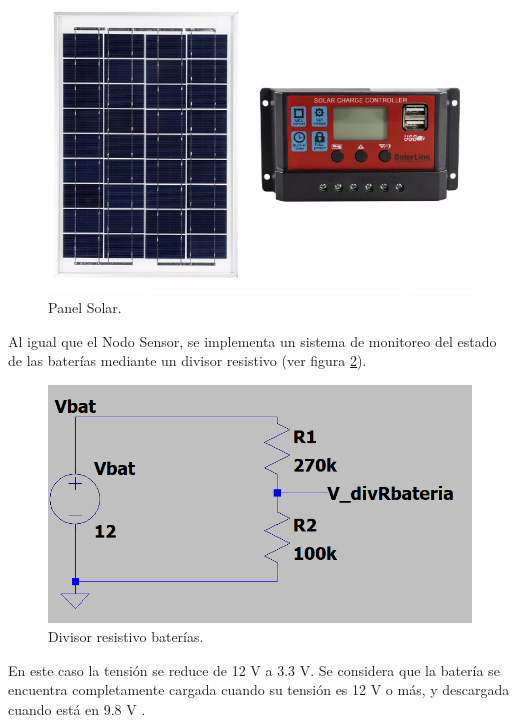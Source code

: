 \begin{figure}[H]
	\centering
	\includegraphics[scale=0.8]{./Figures/Hardware/Alimentacion/panel.png}
	\caption{Panel Solar.}
	\label{fig:panel}
\end{figure}

Al igual que el Nodo Sensor, se implementa un sistema de monitoreo del estado de las baterías mediante un divisor resistivo (ver figura \ref{fig:DivresistivoBat}).

\begin{figure}[H]
	\centering
	\includegraphics[scale=0.6]{./Figures/Hardware/Alimentacion/divisor_bateria.png}
	\caption{Divisor resistivo baterías.}
	\label{fig:DivresistivoBat}
\end{figure}

En este caso la tensión se reduce de 12 V a 3.3 V. Se considera que la batería se encuentra completamente cargada cuando su tensión es 12 V o más, y descargada cuando está en 9.8 V \cite{kaise}. 


